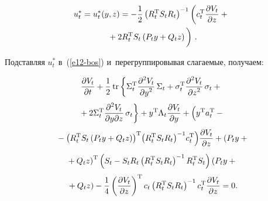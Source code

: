 \begin{multicols}{2}
\vspace*{-2pt}

\noindent
     \begin{multline}
     u_t^*= u_t^*(y,z)=-\fr{1}{2}\left( R_t^{\mathrm{T}} S_t R_t\right)^{-1} \left( c_t^{\mathrm{T}} 
\fr{\partial V_t}{\partial z} +{}\right.\\
\left.{}+2R_t^{\mathrm{T}} S_t\left( P_t y+Q_t z\right)
\vphantom{\fr{\partial V_t}{\partial z}}
\right)\,.
     \label{e13-bos}
     \end{multline} 
     
     \vspace*{-2pt}

     Подставляя $u_t^*$ в~(\ref{e12-bos}) и~перегруппировывая слагаемые, 
получаем:

\vspace*{-6pt}

     \begin{multline}
     \fr{\partial V_t}{\partial t} +\fr{1}{2}\,\mathrm{tr} \left\{ \Sigma_t^{\mathrm{T}} 
\fr{\partial^2 V_t}{\partial y^2}\,\Sigma_t +\sigma_t^{\mathrm{T}}\fr{\partial^2 V_t}{\partial 
z^2}\,\sigma_t +{}\right.\\[3pt]
\left.{}+2\Sigma_t^{\mathrm{T}} \fr{\partial^2 V_t}{\partial y\partial 
z}\,\sigma_t\right\} +y^{\mathrm{T}} \Lambda_t\fr{\partial V_t}{\partial y}+ 
\left(
\vphantom{\left( R_t^{\mathrm{T}} S_t\left( P_t y+Q_tz\right)\right)^{\mathrm{T}}}
 y^{\mathrm{T}} a_t^{\mathrm{T}} -{}\right.\\[3pt]
\!\left.{}-\left( R_t^{\mathrm{T}} S_t\left( P_t y+Q_tz\right)\right)^{\mathrm{T}}\! \left( 
R_t^{\mathrm{T}} S_t R_t\right)^{-1}\! c_t^{\mathrm{T}}\right) \!\fr{\partial V_t}{\partial z}+
 \left( P_t y+{}\right.\hspace*{-3.5019pt}\\[3pt]
\left. {}+Q_t z\right)^{\mathrm{T}} \left( S_t -S_t R_t\left( R_t^{\mathrm{T}} S_t 
R_t\right)^{-1} R_t^{\mathrm{T}} S_t\right) \left( P_t y+{}\right.\\[3pt]
\!\!\!\left.{}+Q_t z\right)-\fr{1}{4}\left(\fr{\partial V_t}{\partial z}\right)^{\mathrm{T}} c_t 
     \left( R_t^{\mathrm{T}} S_t R_t\right)^{-1} c_t^{\mathrm{T}} \fr{\partial V_t}{\partial z}=0.\!\!\!
     \label{e14-bos}
     \end{multline}
     

\end{multicols}
